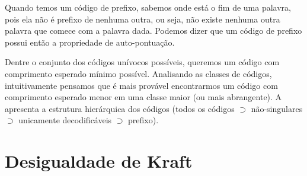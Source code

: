 Quando temos um código de prefixo, sabemos onde está o fim de uma palavra, pois ela não
é prefixo de nenhuma outra, ou seja, não existe nenhuma outra palavra que comece com a palavra
dada. Podemos dizer que um código de prefixo possui então a propriedade de auto-pontuação.

Dentre o conjunto dos códigos unívocos possíveis, queremos um código com
comprimento esperado mínimo possível. Analisando as classes de códigos,
intuitivamente pensamos que é mais provável encontrarmos um código com
comprimento esperado menor em uma classe maior (ou mais abrangente). 
A  apresenta a estrutura hierárquica dos códigos
(todos os códigos $\supset$ não-singulares $\supset$ unicamente decodificáveis $\supset$ prefixo).

\begin{marginfigure}[-4cm]%
  \caption{Diagrama de representação dos conjuntos de códigos, evidenciando a estrutura hierárquica existente.}\label{fig:tiposcodigos}
\end{marginfigure}




\section{Desigualdade de Kraft}


